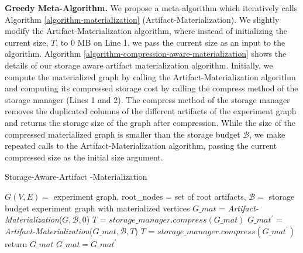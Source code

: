 \textbf{Greedy Meta-Algorithm.}
We propose a meta-algorithm which iteratively calls Algorithm \ref{algorithm-materialization} (Artifact-Materialization).
We slightly modify the Artifact-Materialization algorithm, where instead of initializing the current size, $T$, to 0 MB on Line 1, we pass the current size as an input to the algorithm. 
Algorithm \ref{algorithm-compression-aware-materialization} shows the details of our storage aware artifact materialization algorithm.
Initially, we compute the materialized graph by calling the Artifact-Materialization algorithm and computing its compressed storage cost by calling the compress method of the storage manager (Lines 1 and 2).
The compress method of the storage manager removes the duplicated columns of the different artifacts of the experiment graph and returns the storage size of the graph after compression.
While the size of the compressed materialized graph is smaller than the storage budget $\mathcal{B}$, we make repeated calls to the Artifact-Materialization algorithm, passing the current compressed size as the initial size argument.
\begin{algorithm}[h]
\caption{Storage-Aware-Artifact -Materialization}\label{algorithm-compression-aware-materialization}
\begin{algorithmic}[1]
\Require  $G(V,E)=$ experiment graph, root\_nodes = set of root artifacts, $\mathcal{B}=$ storage budget
\Ensure experiment graph with materialized vertices
\State $G\_mat$ = \textit{Artifact-Materialization}($G, \mathcal{B}, 0$)
\State $T$ = $storage\_manager.compress(G\_mat)$
	\State $G\_mat^\prime$  = \textit{Artifact-Materialization}($G\_mat, \mathcal{B}, T$)
	\State $T$ = $storage\_manager.compress(G\_mat^\prime)$
		\State return $G\_mat$
	\Else
		 \State $G\_mat = G\_mat^\prime$
	\EndIf
\EndWhile
\end{algorithmic}
\end{algorithm}


